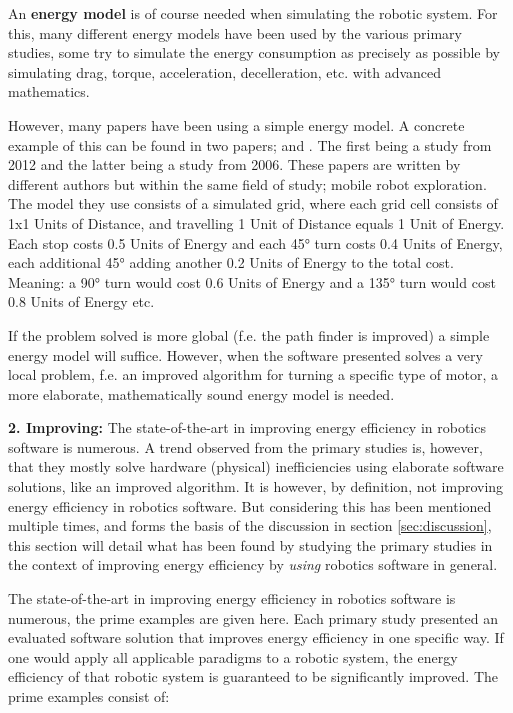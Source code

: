 An \textbf{energy model} is of course needed when simulating the robotic system. 
For this, many different energy models have been used by the various primary studies, some try to simulate the energy consumption 
as precisely as possible by simulating drag, torque, acceleration, decelleration, etc. with advanced mathematics.

However, many papers have been using a simple energy model.
A concrete example of this can be found in two papers; \cite{patel2012exploration_strategy} and \cite{mei2006mobile_exploration}. 
The first being a study from 2012 and the latter being a study from 2006. 
These papers are written by different authors but within the same field of study; mobile robot exploration.
The model they use consists of a simulated grid, where each grid cell consists of 1x1 Units of Distance, 
and travelling 1 Unit of Distance equals 1 Unit of Energy.
Each stop costs 0.5 Units of Energy and each 45° turn costs 0.4 Units of Energy, each additional 45° adding another 
0.2 Units of Energy to the total cost.
Meaning: a 90° turn would cost 0.6 Units of Energy and a 135° turn would cost 0.8 Units of Energy etc.

If the problem solved is more global (f.e. the path finder is improved) a simple energy model will suffice.
However, when the software presented solves a very local problem, f.e. an improved algorithm for turning a specific type of motor,
a more elaborate, mathematically sound energy model is needed.

\vspace{5mm}

\noindent\textbf{2. Improving:}
The state-of-the-art in improving energy efficiency in robotics software is numerous. 
A trend observed from the primary studies is, however, that they mostly solve hardware (physical) inefficiencies using elaborate
software solutions, like an improved algorithm.
It is however, by definition, not improving energy efficiency in robotics software.
But considering this has been mentioned multiple times, and forms the basis of the discussion in section \ref{sec:discussion}, 
this section will detail what has been found by studying the primary studies in the context of improving energy efficiency 
by \textit{using} robotics software in general.

The state-of-the-art in improving energy efficiency in robotics software is numerous, the prime examples are given here.
Each primary study presented an evaluated software solution that improves energy efficiency in one specific way.
If one would apply all applicable paradigms to a robotic system, 
the energy efficiency of that robotic system is guaranteed to be significantly improved.
The prime examples consist of:

